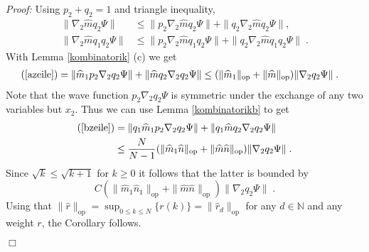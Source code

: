\documentclass[11pt, english, american]{article}
\newenvironment{proof}{\emph{Proof:}}{\begin{flushright} $ \Box $ \end{flushright}}
\begin{document}
\begin{proof}
Using $p_2+q_2=1$ and triangle inequality,
\begin{align}
\label{azeile}\|\nabla_2 \widehat{m}q_2\Psi\|&\leq\|p_2\nabla_2 \widehat{m}q_2\Psi\|+\|q_2\nabla_2 \widehat{m}q_2\Psi\| ,\\
\label{bzeile}\|\nabla_2 \widehat{m}q_1q_2\Psi\|&\leq\|p_2\nabla_2 \widehat{m}q_1q_2\Psi\|+\|q_2\nabla_2 \widehat{m}q_1q_2\Psi\| \;.
\end{align}
With Lemma \ref{kombinatorik} (c)  we get
\begin{align*}
(\ref{azeile})&=\|\widehat{m}_{1}p_2\nabla_2q_2\Psi\|+\|\widehat{m}q_2\nabla_2q_2\Psi\|
%
\leq(\|\widehat{m}_{1}\|_{\text{op}}+\|\widehat{m}\|_{\text{op}})\|\nabla_2q_2\Psi\|\;.
\end{align*}
Note that the wave function $p_2\nabla_2q_2\Psi$ is symmetric under the exchange of any two variables but $x_2$. Thus we can use Lemma \ref{kombinatorikb} to get
\begin{align*}
(\ref{bzeile})&=\|q_1\widehat{m}_{1}p_2\nabla_2q_2\Psi\|+\|q_1\widehat{m}q_2\nabla_2q_2\Psi\|
%
\\&\leq\frac{N}{N-1}(\|\widehat{m}_{1}\widehat{n}\|_{\text{op}}+\|\widehat{m}\widehat{n}\|_{\text{op}})\|\nabla_2q_2\Psi\|\;.
\end{align*}
Since $\sqrt{k}\leq\sqrt{k+1}$ for $k\geq 0$ it follows that the latter is bounded by
$$ C(\|\widehat{m}_{1}\widehat{n}_{1}\|_{\text{op}}+\|\widehat{m}\widehat{n}\|_{\text{op}})\|\nabla_2q_2\Psi\|\;.$$
Using that $\|\widehat{r}\|_{\text{op}}=\sup_{0\leq k \leq N}\{r(k)\}=\|\widehat{r}_d\|_{\text{op}}$
for any $d\in\mathbb{N}$ and any weight $r$, the Corollary follows.
\end{proof}
\end{document}
